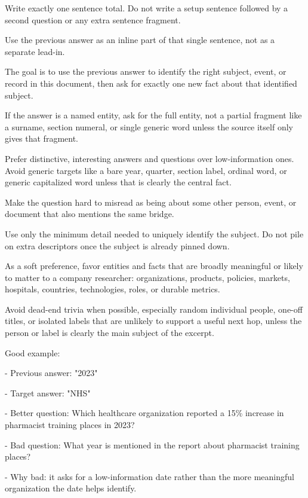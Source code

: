 \begin{tcolorbox}
\begin{scriptsize}
Write exactly one sentence total. Do not write a setup sentence followed by a second question or any extra sentence fragment.\par
Use the previous answer as an inline part of that single sentence, not as a separate lead-in.\par
The goal is to use the previous answer to identify the right subject, event, or record in this document, then ask for exactly one new fact about that identified subject.\par
If the answer is a named entity, ask for the full entity, not a partial fragment like a surname, section numeral, or single generic word unless the source itself only gives that fragment.\par
Prefer distinctive, interesting answers and questions over low-information ones. Avoid generic targets like a bare year, quarter, section label, ordinal word, or generic capitalized word unless that is clearly the central fact.\par
Make the question hard to misread as being about some other person, event, or document that also mentions the same bridge.\par
Use only the minimum detail needed to uniquely identify the subject. Do not pile on extra descriptors once the subject is already pinned down.\par
As a soft preference, favor entities and facts that are broadly meaningful or likely to matter to a company researcher: organizations, products, policies, markets, hospitals, countries, technologies, roles, or durable metrics.\par
Avoid dead-end trivia when possible, especially random individual people, one-off titles, or isolated labels that are unlikely to support a useful next hop, unless the person or label is clearly the main subject of the excerpt.\par
\mbox{}\par
Good example:\par
- Previous answer: "2023"\par
- Target answer: "NHS"\par
- Better question: Which healthcare organization reported a 15\% increase in pharmacist training places in 2023?\par
- Bad question: What year is mentioned in the report about pharmacist training places?\par
- Why bad: it asks for a low-information date rather than the more meaningful organization the date helps identify.\par

\end{scriptsize}
\end{tcolorbox}
